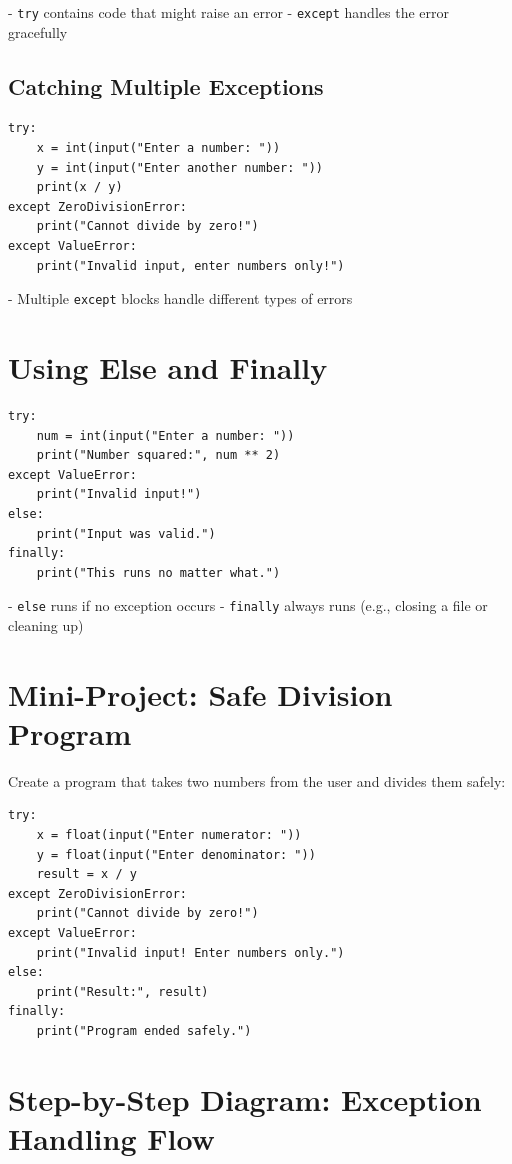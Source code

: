 - \texttt{try} contains code that might raise an error  
- \texttt{except} handles the error gracefully  

\subsection{Catching Multiple Exceptions}

\begin{verbatim}
try:
    x = int(input("Enter a number: "))
    y = int(input("Enter another number: "))
    print(x / y)
except ZeroDivisionError:
    print("Cannot divide by zero!")
except ValueError:
    print("Invalid input, enter numbers only!")
\end{verbatim}

- Multiple \texttt{except} blocks handle different types of errors  

\section{Using Else and Finally}

\begin{verbatim}
try:
    num = int(input("Enter a number: "))
    print("Number squared:", num ** 2)
except ValueError:
    print("Invalid input!")
else:
    print("Input was valid.")
finally:
    print("This runs no matter what.")
\end{verbatim}

- \texttt{else} runs if no exception occurs  
- \texttt{finally} always runs (e.g., closing a file or cleaning up)  

\section{Mini-Project: Safe Division Program}

Create a program that takes two numbers from the user and divides them safely:

\begin{verbatim}
try:
    x = float(input("Enter numerator: "))
    y = float(input("Enter denominator: "))
    result = x / y
except ZeroDivisionError:
    print("Cannot divide by zero!")
except ValueError:
    print("Invalid input! Enter numbers only.")
else:
    print("Result:", result)
finally:
    print("Program ended safely.")
\end{verbatim}

\section{Step-by-Step Diagram: Exception Handling Flow}

